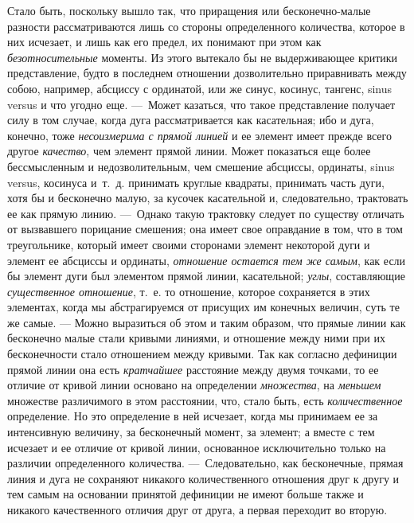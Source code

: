 {Стало быть, поскольку вышло так, что приращения или бесконечно-малые
разности рассматриваются лишь со стороны определенного количества, которое
в них исчезает, и лишь как его предел, их понимают при этом как
{\em безотносительные} моменты. Из этого вытекало бы не
выдерживающее критики представление, будто в последнем отношении
дозволительно приравнивать между собою, например, абсциссу с ординатой, или
же синус, косинус, тангенс, sinus versus и что угодно еще. ---~Может
казаться, что такое представление получает силу в том случае, когда дуга
рассматривается как касательная; ибо и дуга, конечно, тоже
{\em несоизмерима с прямой линией} и ее элемент имеет
прежде всего другое {\em качество}, чем элемент прямой
линии. Может показаться еще более бессмысленным и недозволительным, чем
смешение абсциссы, ординаты, sinus versus, косинуса и~т.~д. принимать
круглые квадраты, принимать часть дуги, хотя бы и бесконечно малую, за
кусочек касательной и, следовательно, трактовать ее как прямую линию.
---~Однако такую трактовку следует по существу отличать от вызвавшего
порицание смешения; она имеет свое оправдание в том, что в том треугольнике,
который имеет своими сторонами элемент некоторой дуги и элемент ее абсциссы
и ординаты, {\em отношение остается тем же самым}, как
если бы элемент дуги был элементом прямой линии, касательной;
{\em углы}, составляющие
{\em существенное отношение}, т.~е. то отношение,
которое сохраняется в этих элементах, когда мы абстрагируемся от присущих
им конечных величин, суть те же самые. — Можно выразиться об этом и таким
образом, что прямые линии как бесконечно малые стали кривыми линиями, и
отношение между ними при их бесконечности стало отношением между кривыми.
Так как согласно дефиниции прямой линии она есть
{\em кратчайшее} расстояние между двумя точками, то ее
отличие от кривой линии основано на определении
{\em множества}, на {\em меньшем}
множестве различимого в этом расстоянии, что, стало быть, есть
{\em количественное} определение. Но это определение в
ней исчезает, когда мы принимаем ее за интенсивную величину, за бесконечный
момент, за элемент; а вместе с тем исчезает и ее отличие от кривой линии,
основанное исключительно только на различии определенного количества.
---~Следовательно, как бесконечные,
прямая линия и дуга не сохраняют никакого
количественного отношения друг к другу и тем самым на основании принятой
дефиниции не имеют больше также и никакого качественного отличия друг от
друга, а первая переходит во вторую.

}
